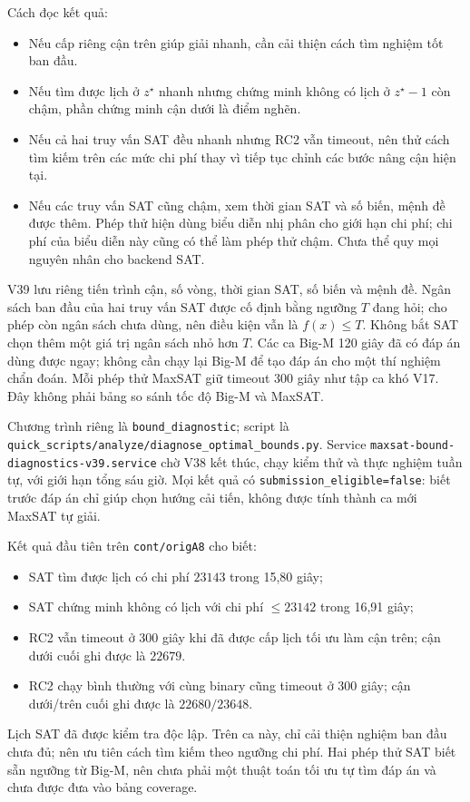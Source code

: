 \documentclass[11pt,a4paper]{article}
\newcommand{\code}[1]{\texttt{#1}}
\newcommand{\file}[1]{\nolinkurl{#1}}
\begin{document}
Cách đọc kết quả:
\begin{itemize}
\item Nếu cấp riêng cận trên giúp giải nhanh, cần cải thiện cách tìm
      nghiệm tốt ban đầu.
\item Nếu tìm được lịch ở $z^\star$ nhanh nhưng chứng minh không có lịch
      ở $z^\star-1$ còn chậm, phần chứng minh cận dưới là điểm nghẽn.
\item Nếu cả hai truy vấn SAT đều nhanh nhưng RC2 vẫn timeout, nên thử
      cách tìm kiếm trên các mức chi phí thay vì tiếp tục chỉnh các bước
      nâng cận hiện tại.
\item Nếu các truy vấn SAT cũng chậm, xem thời gian SAT và số biến,
      mệnh đề được thêm. Phép thử hiện dùng biểu diễn nhị phân cho giới
      hạn chi phí; chi phí của biểu diễn này cũng có thể làm phép thử
      chậm. Chưa thể quy mọi nguyên nhân cho backend SAT.
\end{itemize}

V39 lưu riêng tiến trình cận, số vòng, thời gian SAT, số biến và mệnh đề.
Ngân sách ban đầu của hai truy vấn SAT được cố định bằng ngưỡng $T$ đang
hỏi; cho phép còn ngân sách chưa dùng, nên điều kiện vẫn là $f(x)\le T$.
Không bắt SAT chọn thêm một giá trị ngân sách nhỏ hơn $T$.
Các ca Big-M 120 giây đã có đáp án dùng được ngay; không cần chạy lại
Big-M để tạo đáp án cho một thí nghiệm chẩn đoán. Mỗi phép thử MaxSAT
giữ timeout 300 giây như tập ca khó V17. Đây không phải bảng so sánh
tốc độ Big-M và MaxSAT.

Chương trình riêng là \file{bound\_diagnostic}; script là
\file{quick\_scripts/analyze/diagnose\_optimal\_bounds.py}.
Service \file{maxsat-bound-diagnostics-v39.service} chờ V38 kết thúc,
chạy kiểm thử và thực nghiệm tuần tự, với giới hạn tổng sáu giờ.
Mọi kết quả có \code{submission\_eligible=false}: biết trước đáp án chỉ
giúp chọn hướng cải tiến, không được tính thành ca mới MaxSAT tự giải.

Kết quả đầu tiên trên \code{cont/origA8} cho biết:
\begin{itemize}
\item SAT tìm được lịch có chi phí $23143$ trong 15,80 giây;
\item SAT chứng minh không có lịch với chi phí $\le23142$ trong 16,91 giây;
\item RC2 vẫn timeout ở 300 giây khi đã được cấp lịch tối ưu làm cận trên;
      cận dưới cuối ghi được là $22679$.
\item RC2 chạy bình thường với cùng binary cũng timeout ở 300 giây;
      cận dưới/trên cuối ghi được là $22680/23648$.
\end{itemize}
Lịch SAT đã được kiểm tra độc lập. Trên ca này, chỉ cải thiện nghiệm ban
đầu chưa đủ; nên ưu tiên cách tìm kiếm theo ngưỡng chi phí. Hai phép thử
SAT biết sẵn ngưỡng từ Big-M, nên chưa phải một thuật toán tối ưu tự tìm
đáp án và chưa được đưa vào bảng coverage.
\end{document}
